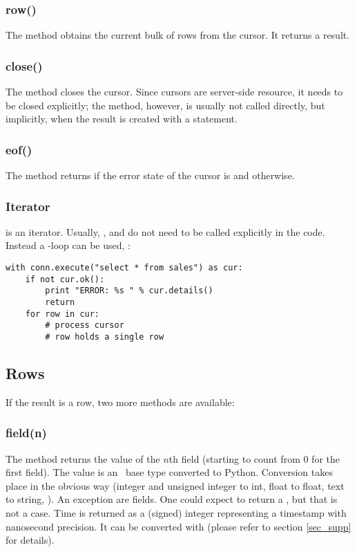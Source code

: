 \subsubsection{row()}
The method obtains the current
bulk of rows from the cursor.
It returns a  result.

\subsubsection{close()}
The method closes the cursor.
Since cursors are server-side
resource, it needs to be closed
explicitly; the method, however,
is usually not called directly,
but implicitly, when the result
is created with a  statement.

\subsubsection{eof()}
The method returns 
if the error state of the cursor
is  and 
otherwise.

\subsubsection{Iterator}
 is an iterator.
Usually, , 
and  do not need to be called
explicitly in the code.
Instead a -loop  can be used, \eg:

\begin{python}
\begin{lstlisting}
with conn.execute("select * from sales") as cur:
    if not cur.ok():
        print "ERROR: %s " % cur.details()
        return
    for row in cur:
        # process cursor
        # row holds a single row
\end{lstlisting}
\end{python}

\subsection{Rows}
If the result is a row,
two more methods are available:

\subsubsection{field(n)}
The method returns the value
of the $n$th field (starting to count
from 0 for the first field).
The value is an \sql\ base type
converted to Python.
Conversion takes place in the obvious way
(integer and unsigned integer to int,
 float to float, text to string, \etc).
An exception are  fields.
One could expect  to return
a , but that is not a case.
Time is returned as a (signed) integer
representing a  timestamp
with nanosecond precision.
It can be converted with 
(please refer to section \ref{sec_supp}
for details).

